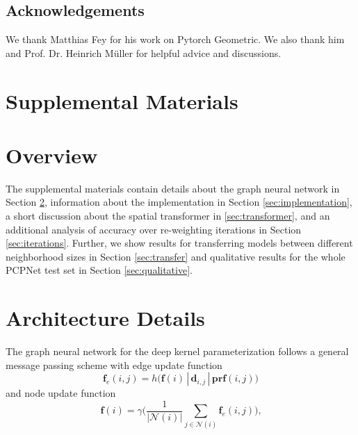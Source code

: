 \documentclass[10pt,twocolumn,letterpaper]{article}
\begin{document}
\subsection*{Acknowledgements}
We thank Matthias Fey for his work on Pytorch Geometric. We also thank him and Prof. Dr. Heinrich M\"uller for helpful advice and discussions.

{\small


}


\appendix
\section*{Supplemental Materials}
\section{Overview}
The supplemental materials contain details about the graph neural network in Section \ref{sec:architecture}, information about the implementation in Section \ref{sec:implementation}, a short discussion about the spatial transformer in \ref{sec:transformer}, and an additional analysis of accuracy over re-weighting iterations in Section \ref{sec:iterations}. Further, we show results for transferring models between different neighborhood sizes in Section \ref{sec:transfer} and qualitative results for the whole PCPNet test set in Section \ref{sec:qualitative}.



\section{Architecture Details}
\label{sec:architecture}
The graph neural network for the deep kernel parameterization follows a general message passing scheme \cite{Fey:2019} with edge update function
\begin{equation}
\mathbf{f}_e(i,j) = h\big(\mathbf{f}(i)\,|\,\mathbf{d}_{i,j}\,|\,\mathbf{prf}(i, j)\big)
\end{equation}
and node update function
\begin{equation}
\mathbf{f}(i) = \gamma\Big(\frac{1}{|\mathcal{N}(i)|}\sum_{j\in \mathcal{N}(i)} \mathbf{f}_e(i,j)\Big) \textrm{,} 
\end{equation}
\end{document}
